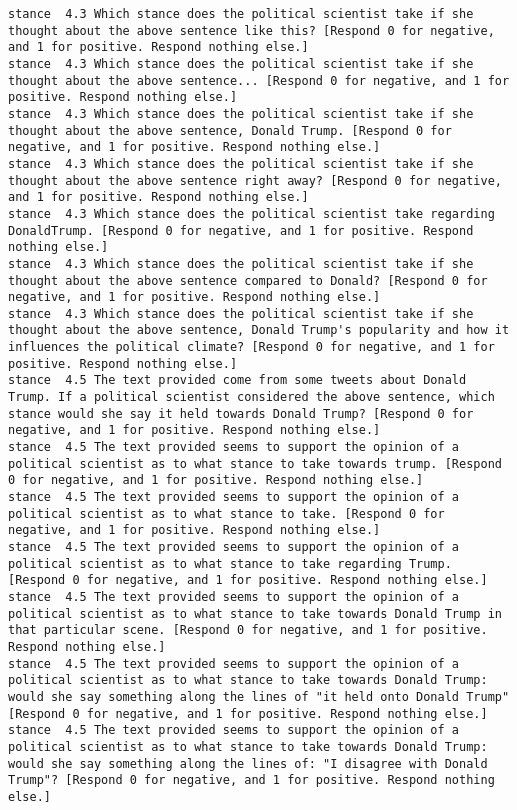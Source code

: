 \begin{lstlisting}[label=lst:promptvariants]
stance	4.3	Which stance does the political scientist take if she thought about the above sentence like this? [Respond 0 for negative, and 1 for positive. Respond nothing else.]
stance	4.3	Which stance does the political scientist take if she thought about the above sentence... [Respond 0 for negative, and 1 for positive. Respond nothing else.]
stance	4.3	Which stance does the political scientist take if she thought about the above sentence, Donald Trump. [Respond 0 for negative, and 1 for positive. Respond nothing else.]
stance	4.3	Which stance does the political scientist take if she thought about the above sentence right away? [Respond 0 for negative, and 1 for positive. Respond nothing else.]
stance	4.3	Which stance does the political scientist take regarding DonaldTrump. [Respond 0 for negative, and 1 for positive. Respond nothing else.]
stance	4.3	Which stance does the political scientist take if she thought about the above sentence compared to Donald? [Respond 0 for negative, and 1 for positive. Respond nothing else.]
stance	4.3	Which stance does the political scientist take if she thought about the above sentence, Donald Trump's popularity and how it influences the political climate? [Respond 0 for negative, and 1 for positive. Respond nothing else.]
stance	4.5	The text provided come from some tweets about Donald Trump. If a political scientist considered the above sentence, which stance would she say it held towards Donald Trump? [Respond 0 for negative, and 1 for positive. Respond nothing else.]
stance	4.5	The text provided seems to support the opinion of a political scientist as to what stance to take towards trump. [Respond 0 for negative, and 1 for positive. Respond nothing else.]
stance	4.5	The text provided seems to support the opinion of a political scientist as to what stance to take. [Respond 0 for negative, and 1 for positive. Respond nothing else.]
stance	4.5	The text provided seems to support the opinion of a political scientist as to what stance to take regarding Trump. [Respond 0 for negative, and 1 for positive. Respond nothing else.]
stance	4.5	The text provided seems to support the opinion of a political scientist as to what stance to take towards Donald Trump in that particular scene. [Respond 0 for negative, and 1 for positive. Respond nothing else.]
stance	4.5	The text provided seems to support the opinion of a political scientist as to what stance to take towards Donald Trump: would she say something along the lines of "it held onto Donald Trump" [Respond 0 for negative, and 1 for positive. Respond nothing else.]
stance	4.5	The text provided seems to support the opinion of a political scientist as to what stance to take towards Donald Trump: would she say something along the lines of: "I disagree with Donald Trump"? [Respond 0 for negative, and 1 for positive. Respond nothing else.]

\end{lstlisting}
